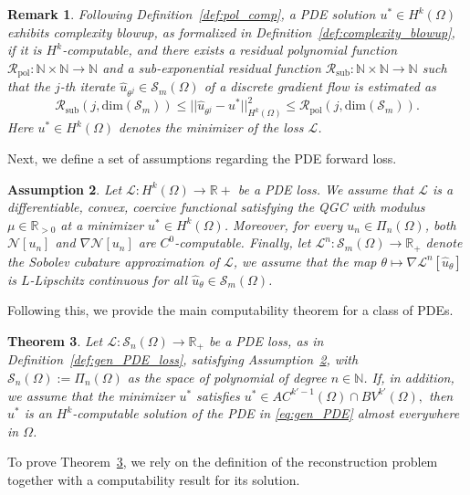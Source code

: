 \documentclass[pdflatex]{sn-jnl}%
\newtheorem{theorem}{Theorem}[section]%
\newtheorem{remark}[theorem]{Remark}
\newtheorem{assumption}[theorem]{Assumption}%
\begin{document}
\begin{remark}\label{rk:complexity_blowup}
    Following Definition~\ref{def:pol_comp}, a PDE solution $u^*\in H^k(\Omega)$ exhibits complexity blowup, as formalized in Definition~\ref{def:complexity_blowup}, if it is $H^k$-computable, and there exists a residual polynomial function $\mathcal{R}_{\mathrm{pol}}:\mathbb{N}\times\mathbb{N}\rightarrow\mathbb{N}$ and a sub-exponential residual function $\mathcal{R}_{\mathrm{sub}}:\mathbb{N}\times \mathbb{N}\rightarrow\mathbb{N}$ such that the $j$-th iterate $\hat{u}_{\theta^j}\in \mathcal{S}_m(\Omega)$ of a discrete gradient flow is estimated as   
    \begin{equation}\label{eq:compl_bounds}
       \mathcal{R}_{\mathrm{sub}}(j,\mathrm{dim}(\mathcal{S}_m))\leq ||\hat{u}_{\theta^j}-u^*||_{H^k(\Omega)}^2\leq \mathcal{R}_{\mathrm{pol}}(j,\mathrm{dim}(\mathcal{S}_m)).
    \end{equation}
    Here $u^*\in H^k(\Omega)$ denotes the minimizer of the loss $\mathcal{L}$. 
\end{remark}
Next, we define a set of assumptions regarding the PDE forward loss.
\begin{assumption}\label{ass:PDE_loss}
    Let $\mathcal{L}:H^k(\Omega)\to\mathbb{R}+$ be a PDE loss. We assume that $\mathcal{L}$ is a differentiable, convex, coercive functional satisfying the QGC with modulus $\mu\in \mathbb{R}_{>0}$ at a minimizer $u^*\in H^k(\Omega)$. Moreover, for every $u_n \in \Pi_{n}(\Omega)$, both $\mathcal{N}[u_n]$ and $\nabla\mathcal{N}[u_n]$ are $C^0$-computable. Finally, let $\mathcal{L}^n:\mathcal{S}_m(\Omega)\rightarrow\mathbb{R}_+$ denote the Sobolev cubature approximation of $\mathcal{L}$, we assume that the map $\theta \mapsto\nabla \mathcal{L}^n[\hat{u}_\theta]$ is $L$-Lipschitz continuous for all $\hat{u}_\theta\in \mathcal{S}_m(\Omega)$. 
\end{assumption}
Following this, we provide the main computability theorem for a class of PDEs. 
\begin{theorem}\label{thm:compt}
Let $\mathcal{L}:\mathcal{S}_n(\Omega)\rightarrow \mathbb{R}_+$ be a PDE loss, as in Definition~\ref{def:gen_PDE_loss}, satisfying Assumption~\ref{ass:PDE_loss}, with $\mathcal{S}_{n}(\Omega):=\Pi_n(\Omega)$ as the space of polynomial of degree $n\in \mathbb{N}$. If, in addition, we assume that the minimizer $u^*$ satisfies $u^*\in AC^{k'-1}(\Omega)\cap BV^{k'}(\Omega),$ 
then $u^*$ is an $H^k$-computable solution of the PDE in \eqref{eq:gen_PDE} almost everywhere in $\Omega$. 
\end{theorem}
To prove Theorem~\ref{thm:compt}, we rely on the definition of the reconstruction problem together with a computability result for its solution.
\end{document}
